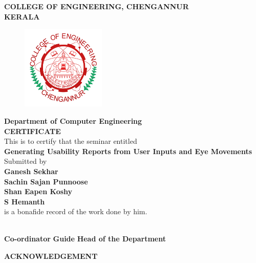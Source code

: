 \documentclass[a4paper,12pt,oneside]{article}
\begin{document}
\newpage
\thispagestyle{empty}
\begin{center}
\setlength{\baselineskip}{1.5\baselineskip}
{\large\textbf{COLLEGE OF ENGINEERING, CHENGANNUR}}
\\
{\large\textbf{KERALA}}
\\
\begin{figure}[H]
\centering
\includegraphics[width=4cm]{ceclogo.png}
\end{figure}
\setlength{\baselineskip}{1.5\baselineskip}
\textbf{Department of Computer Engineering}
\\
\textbf{CERTIFICATE}
\\
This is to certify that the seminar entitled
\\
\textbf{Generating Usability Reports from User Inputs and Eye Movements}
\\
Submitted by
\\
\textbf{Ganesh Sekhar}
\\
\textbf{Sachin Sajan Punnoose}
\\
\textbf{Shan Eapen Koshy}
\\
\textbf{S Hemanth}
\\
is a bonafide record of the work done by him.
\end{center}
\vspace{20ex}
\hspace{5ex}
\hspace{15ex}
\hspace{16ex}
\\
\vspace{0ex}
\hspace{4ex}
\textbf{Co-ordinator}
\hspace{20ex}
\textbf{Guide}
\hspace{16ex}
\textbf{Head of the Department} 
\newpage
{}
\renewcommand{\headrulewidth}{0.0pt}
\renewcommand{\footrulewidth}{0.0pt}
\begin{center}
\large{\textbf{ACKNOWLEDGEMENT}}
\end{center}
\vspace{6ex}
\setlength{\baselineskip}{1.5\baselineskip}
\end{document}
